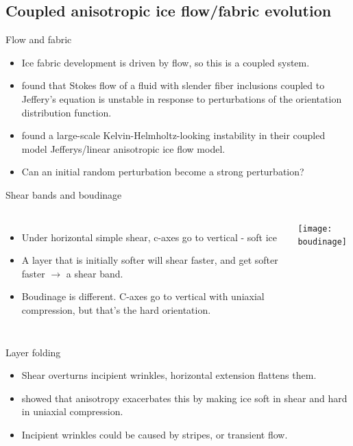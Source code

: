 \documentclass{beamer}
\begin{document}
\subsection{Coupled anisotropic ice flow/fabric evolution}
\begin{frame}{Flow and fabric}
\begin{itemize}
   \item Ice fabric development is driven by flow, so this is a coupled system.
   \item \citet{montgomery-smith2011} found that Stokes flow of a fluid with slender fiber inclusions coupled to Jeffery's equation is unstable in response to perturbations of the orientation distribution function.
   \item \citet{gillet2006} found a large-scale Kelvin-Helmholtz-looking instability in their coupled model Jefferys/linear anisotropic ice flow model.
   \item Can an initial random perturbation become a strong perturbation?
\end{itemize}
\end{frame}
\begin{frame}{Shear bands and boudinage}
   \begin{columns}[T]
   \begin{itemize}
      \item Under horizontal simple shear, c-axes go to vertical - soft ice
      \item A layer that is initially softer will shear faster, and get softer faster 
      $\rightarrow$ a shear band.
      \item Boudinage is different. C-axes go to vertical with uniaxial compression, but that's the hard orientation.
   \end{itemize}
   \texttt{[image: boudinage]}
\end{columns}
\end{frame}

\begin{frame}{Layer folding}
   \begin{itemize}
      \item Shear overturns incipient wrinkles, horizontal extension flattens them.
      \item \citet{alley97} showed that anisotropy exacerbates this by making ice soft in shear and hard in uniaxial compression.
      \item Incipient wrinkles could be caused by stripes, or transient flow.
   \end{itemize}
\end{frame}
\end{document}

